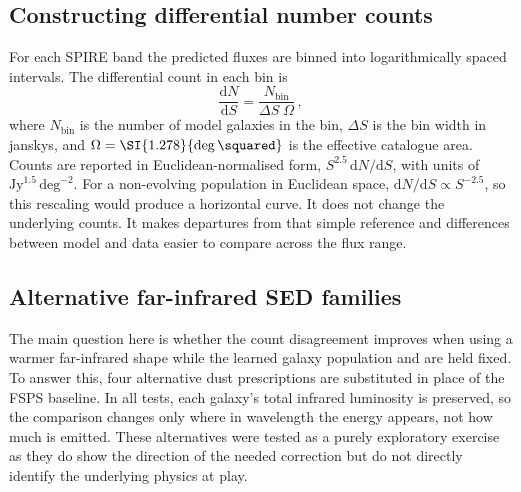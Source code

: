 \documentclass[12pt,a4paper]{article}
\begin{document}
\subsection{Constructing differential number counts}
\label{sec:methods:counts}

For each SPIRE band the predicted fluxes are binned into logarithmically spaced
intervals. The differential count in each bin is
\begin{equation}
  \frac{\mathrm{d}N}{\mathrm{d}S} = \frac{N_\mathrm{bin}}{\Delta S \;\Omega}\,,
\end{equation}
where $N_\mathrm{bin}$ is the number of model galaxies in the bin, $\Delta S$ is the
bin width in janskys, and $\Omega = \SI{1.278}{\deg\squared}$ is the effective catalogue
area. Counts are reported in Euclidean-normalised form,
$S^{2.5}\,\mathrm{d}N/\mathrm{d}S$, with units of
$\mathrm{Jy}^{1.5}\,\mathrm{deg}^{-2}$. For a non-evolving population in Euclidean
space, $\mathrm{d}N/\mathrm{d}S\propto S^{-2.5}$, so this rescaling would produce a
horizontal curve. It does not change the underlying counts. It makes departures from
that simple reference and differences between model and data easier to compare across
the flux range.

\subsection{Alternative far-infrared SED families}
\label{sec:methods:templates}

The main question here is whether the count disagreement improves when using a warmer far-infrared
shape while the learned galaxy population and \LIR{} are held fixed. To answer this, four
alternative dust prescriptions are substituted in place of the FSPS baseline. In all tests, each galaxy's total infrared luminosity is preserved, so the
comparison changes only where in wavelength the energy appears, not how much is emitted.
These alternatives were tested as a purely exploratory exercise as they do show the direction of the needed correction but do not directly identify the underlying physics at play. 
\end{document}
